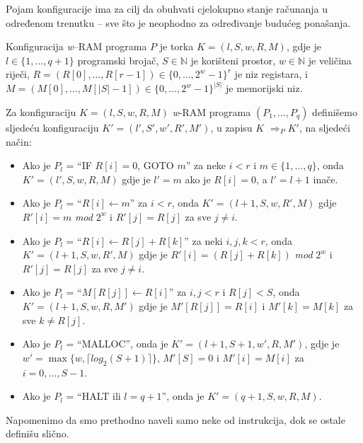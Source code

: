 Pojam konfiguracije ima za cilj da obuhvati cjelokupno stanje računanja u određenom trenutku --  sve što je neophodno za određivanje budućeg ponašanja.
\begin{definition}
Konfiguracija  \emph{w}--RAM programa $P$ je torka $K = (l, S, w, R, M)$, gdje je $l \in  \{1, \ldots, q + 1\}$ 
programski brojač, $S \in  \mathbb{N}$ je korišteni prostor, $w \in  \mathbb{N}$ je veličina riječi, $R = (R[0], \ldots , R[r - 1]) \in  \{0, \ldots , 2^w - 1\}^r$ je
niz registara, i $M = (M[0], \ldots, M[|S| - 1]) \in  \{0, \ldots, 2^w - 1\}^{|S|}$ je memorijski niz.
\end{definition}
\begin{definition}
 Za konfiguraciju $K = (l, S, w, R, M)$ \textit{w}-RAM programa $(P_1, \ldots, P_q)$ definišemo sljedeću konfiguraciju $K' = (l', S', w', R', M')$, u zapisu $K$ $\Rightarrow_P K'$, na sljedeći način:
 
 \begin{itemize}
 	\item Ako je $P_l$ = ``IF $R[i] = 0$, GOTO $m$'' za neke $i < r$ i $m \in  \{1, \ldots , q\}$, onda  $K' = (l', S, w, R, M)$ gdje je  $l'= m$ ako je $R[i] = 0$, a $l' = l + 1$ inače. 
 	\item Ako je $P_l$ = ``$R[i] \leftarrow  m$'' za $i < r$, onda $K' = (l  + 1, S, w, R', M)$ gdje  $R'[i] = m$ \emph{mod} $2^w$ i $R'[ j] = R[ j]$ za sve $j \neq i$. 
 	\item Ako je $P_l$ = ``$R[i] \leftarrow R[ j] + R[k]$'' za neki $i, j, k < r$, onda  $K' = (l+1, S, w, R', M)$   gdje je $R'[i] = (R[ j]+R[k])$ \textit{mod} $2^w$
 	i $R'[j] = R[j]$ za sve $j \neq i$.
 	\item Ako je $P_l$ = ``$M[R[ j]] \leftarrow R[i]$'' za $i, j < r$ i $R[ j] < S$, onda $K' = (l+ 1, S, w, R, M')$ gdje je $M'[R[ j]] = R[i]$ i
 	$M'[k] = M[k]$ za sve  $k \neq  R[ j]$.
 	\item Ako je $P_l$ = ``MALLOC'', onda je $K' = (l+ 1, S + 1, w', R, M')$, gdje je $w' = \max\{w, \lceil log_2(S + 1) \rceil \}$, $M'[S] = 0$ i
 	$M'[i] = M[i]$ za $i = 0, \ldots , S-1$.
 	\item Ako je $P_l$ = ``HALT ili  $l = q + 1$'', onda je $K' = (q + 1, S, w, R, M)$.
 \end{itemize}
 
 
\end{definition}

Napomenimo da smo prethodno naveli   samo neke od instrukcija, dok se ostale definišu slično. \\


